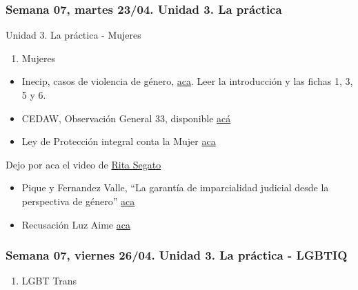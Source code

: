 \documentclass[
]{article}
\providecommand{\tightlist}{%
  \setlength{\itemsep}{0pt}\setlength{\parskip}{0pt}}
\begin{document}
\hypertarget{semana-07-martes-2304.-unidad-3.-la-pruxe1ctica}{%
\subsubsection{Semana 07, martes 23/04. Unidad 3. La
práctica}\label{semana-07-martes-2304.-unidad-3.-la-pruxe1ctica}}

Unidad 3. La práctica - Mujeres

\begin{enumerate}
\def\labelenumi{\alph{enumi}.}
\setcounter{enumi}{4}
\tightlist
\item
  Mujeres
\end{enumerate}

\begin{itemize}
\item
  Inecip, casos de violencia de género,
  \href{https://inecip.org/publicaciones/herramientas-jurisprudenciales-para-el-litigio-con-perspectiva-de-genero/}{aca}.
  Leer la introducción y las fichas 1, 3, 5 y 6.
\item
  CEDAW, Observación General 33, disponible
  \href{https://drive.google.com/file/d/1j3suY4Q3JhS5EzbAvs6_K6XSbQsOQ7D7/view?usp=sharing}{acá}
\item
  Ley de Protección integral conta la Mujer
  \href{http://servicios.infoleg.gob.ar/infolegInternet/anexos/150000-154999/152155/texact.htm}{aca}
\end{itemize}

Dejo por aca el video de \href{https://youtu.be/prUqWHKnUd4}{Rita
Segato}

\begin{itemize}
\item
  Pique y Fernandez Valle, ``La garantía de imparcialidad judicial desde
  la perspectiva de género''
  \href{https://drive.google.com/file/d/1atsNG8fNfxcBruDPtPve0N3AmUf6OA3h/view?usp=sharing}{aca}
\item
  Recusación Luz Aime
  \href{https://drive.google.com/file/d/1ZWe1xva3x_Y0ttVg2CZ4eliKBj-8bbBy/preview}{aca}
\end{itemize}

\hypertarget{semana-07-viernes-2604.-unidad-3.-la-pruxe1ctica---lgbtiq}{%
\subsubsection{Semana 07, viernes 26/04. Unidad 3. La práctica -
LGBTIQ}\label{semana-07-viernes-2604.-unidad-3.-la-pruxe1ctica---lgbtiq}}

\begin{enumerate}
\def\labelenumi{\alph{enumi}.}
\setcounter{enumi}{3}
\tightlist
\item
  LGBT Trans
\end{enumerate}
\end{document}

